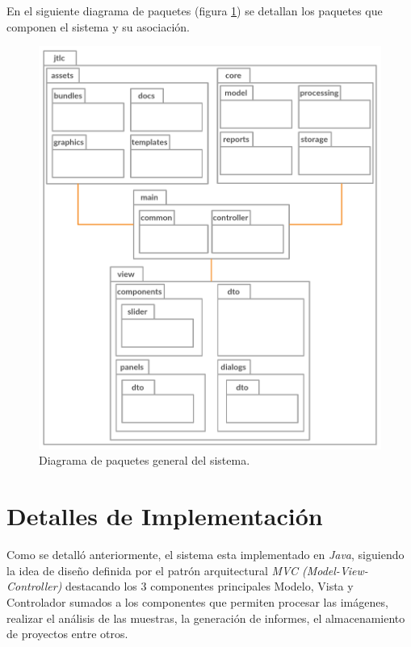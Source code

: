 En el siguiente diagrama de paquetes \cite{uml} (figura \ref{fig:disenoPaquetes}) se detallan los paquetes que componen el sistema y su asociaci\'on.\\
\begin{figure}[H]
	\centering
	\vspace{-0.5cm}
	\includegraphics[width=400pt]{imagenes-jtlc/paquetes}
	\centering
	\vspace{-0.5cm}
	\caption{Diagrama de paquetes general del sistema.}
	\label{fig:disenoPaquetes}
\end{figure}

\section{Detalles de Implementaci\'on}
Como se detall\'o anteriormente, el sistema esta implementado en \textit{Java}, siguiendo la idea de dise\~no definida por el patr\'on arquitectural \textit{ MVC (Model-View-Controller)} destacando los 3 componentes principales Modelo, Vista y Controlador sumados a los componentes que permiten procesar las im\'agenes, realizar el an\'alisis de las muestras, la generaci\'on de informes, el almacenamiento de proyectos entre otros.


